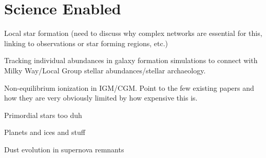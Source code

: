\section{Science Enabled}


Local star formation (need to discuss why complex networks are
essential for this, linking to observations or star forming regions,
etc.)

Tracking individual abundances in galaxy formation simulations to
connect with Milky Way/Local Group stellar abundances/stellar archaeology.

Non-equilibrium ionization in IGM/CGM. Point to the few existing
papers and how they are very obviously limited by how expensive this
is.

Primordial stars too duh

Planets and ices and stuff

Dust evolution in supernova remnants

